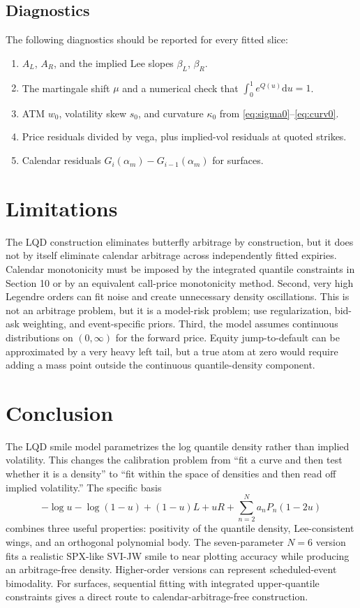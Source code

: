\documentclass[11pt]{article}
\newcommand{\dd}{\mathrm{d}}
\newcommand{\1}{\mathbf{1}}
\begin{document}
\subsection{Diagnostics}

The following diagnostics should be reported for every fitted slice:
\begin{enumerate}[leftmargin=2.2em]
\item $A_L$, $A_R$, and the implied Lee slopes $\beta_L$, $\beta_R$.
\item The martingale shift $\mu$ and a numerical check that $\int_0^1e^{Q(u)}\dd u=1$.
\item ATM $w_0$, volatility skew $s_0$, and curvature $\kappa_0$ from \eqref{eq:sigma0}--\eqref{eq:curv0}.
\item Price residuals divided by vega, plus implied-vol residuals at quoted strikes.
\item Calendar residuals $G_i(\alpha_m)-G_{i-1}(\alpha_m)$ for surfaces.
\end{enumerate}

\section{Limitations}

The LQD construction eliminates butterfly arbitrage by construction, but it does not by itself eliminate calendar arbitrage across independently fitted expiries.  Calendar monotonicity must be imposed by the integrated quantile constraints in Section 10 or by an equivalent call-price monotonicity method.  Second, very high Legendre orders can fit noise and create unnecessary density oscillations.  This is not an arbitrage problem, but it is a model-risk problem; use regularization, bid-ask weighting, and event-specific priors.  Third, the model assumes continuous distributions on $(0,\infty)$ for the forward price.  Equity jump-to-default can be approximated by a very heavy left tail, but a true atom at zero would require adding a mass point outside the continuous quantile-density component.

\section{Conclusion}

The LQD smile model parametrizes the log quantile density rather than implied volatility.  This changes the calibration problem from ``fit a curve and then test whether it is a density'' to ``fit within the space of densities and then read off implied volatility.''  The specific basis
\begin{equation}
    -\log u-\log(1-u)+(1-u)L+uR+\sum_{n=2}^{N}a_nP_n(1-2u)
\end{equation}
combines three useful properties: positivity of the quantile density, Lee-consistent wings, and an orthogonal polynomial body.  The seven-parameter $N=6$ version fits a realistic SPX-like SVI-JW smile to near plotting accuracy while producing an arbitrage-free density.  Higher-order versions can represent scheduled-event bimodality.  For surfaces, sequential fitting with integrated upper-quantile constraints gives a direct route to calendar-arbitrage-free construction.
\end{document}
